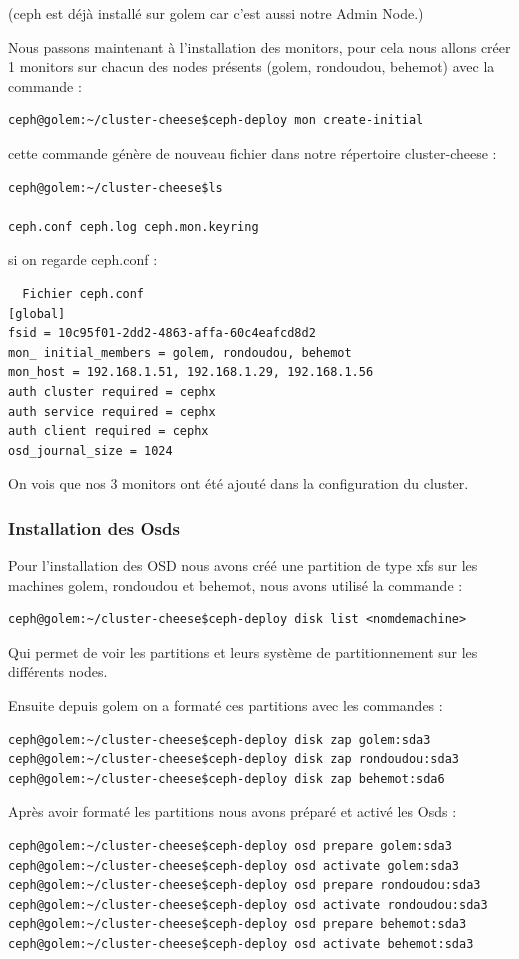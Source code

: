 \documentclass[12pt]{article}
\begin{document}
(ceph est déjà installé sur golem car c'est aussi notre Admin Node.)

Nous passons maintenant à l'installation des monitors, pour cela nous allons créer 1 monitors sur chacun des nodes présents (golem, rondoudou, behemot) avec la commande :
\begin{verbatim}
ceph@golem:~/cluster-cheese$ceph-deploy mon create-initial
\end{verbatim}

cette commande génère de nouveau fichier dans notre répertoire cluster-cheese :
\begin{verbatim}
ceph@golem:~/cluster-cheese$ls

ceph.conf ceph.log ceph.mon.keyring
\end{verbatim}

si on regarde ceph.conf :
\begin{verbatim}
  Fichier ceph.conf
[global]
fsid = 10c95f01-2dd2-4863-affa-60c4eafcd8d2
mon_ initial_members = golem, rondoudou, behemot
mon_host = 192.168.1.51, 192.168.1.29, 192.168.1.56
auth cluster required = cephx
auth service required = cephx
auth client required = cephx
osd_journal_size = 1024
\end{verbatim}

On vois que nos 3 monitors ont été ajouté dans la configuration du cluster.

\subsubsection{Installation des Osds}

Pour l'installation des OSD nous avons créé une partition de type xfs sur les machines golem, rondoudou et behemot, nous avons utilisé la commande :
\begin{verbatim}
ceph@golem:~/cluster-cheese$ceph-deploy disk list <nomdemachine>
\end{verbatim}

Qui permet de voir les partitions et leurs système de partitionnement sur les différents nodes.

Ensuite depuis golem on a formaté ces partitions avec les commandes :
\begin{verbatim}
ceph@golem:~/cluster-cheese$ceph-deploy disk zap golem:sda3
ceph@golem:~/cluster-cheese$ceph-deploy disk zap rondoudou:sda3
ceph@golem:~/cluster-cheese$ceph-deploy disk zap behemot:sda6
\end{verbatim}

Après avoir formaté les partitions nous avons préparé et activé les Osds :
\begin{verbatim}
ceph@golem:~/cluster-cheese$ceph-deploy osd prepare golem:sda3
ceph@golem:~/cluster-cheese$ceph-deploy osd activate golem:sda3
ceph@golem:~/cluster-cheese$ceph-deploy osd prepare rondoudou:sda3
ceph@golem:~/cluster-cheese$ceph-deploy osd activate rondoudou:sda3
ceph@golem:~/cluster-cheese$ceph-deploy osd prepare behemot:sda3
ceph@golem:~/cluster-cheese$ceph-deploy osd activate behemot:sda3
\end{verbatim}
\end{document}
